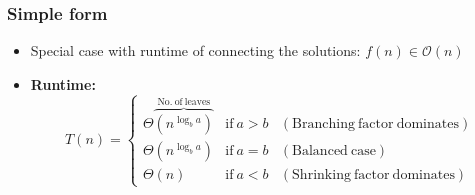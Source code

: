 \documentclass[12pt, a4paper]{scrartcl}
\newcommand{\bigO}{\mathcal{O}}
\begin{document}
\subsubsection{Simple form}
\label{sec:master_simple}
\begin{itemize}
\item Special case with runtime of connecting the solutions: $f(n)\in\bigO(n)$
\item \textbf{Runtime:}
  \begin{equation*}
    T(n)=\left\{
      \begin{array}{lll}
        \Theta\overbrace{(n^{\log_b a})}^{\mathrm{No.\ of\ leaves}}&\mathrm{if\ } a>b & \mathrm{(Branching\ factor\ dominates)}\\
        \Theta(n^{\log_b a})&\mathrm{if\ } a=b& \mathrm{(Balanced\ case)} \\
        \Theta(n)&\mathrm{if\ } a<b& \mathrm{(Shrinking\ factor\ dominates)}

      \end{array}
\right.
  \end{equation*}
\end{itemize}
\end{document}

